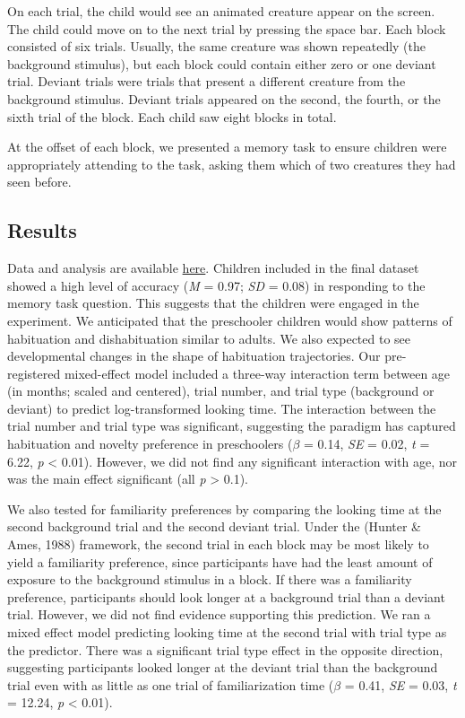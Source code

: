 \documentclass[10pt, letterpaper]{article}
\begin{document}
On each trial, the child would see an animated creature appear on the
screen. The child could move on to the next trial by pressing the space
bar. Each block consisted of six trials. Usually, the same creature was
shown repeatedly (the background stimulus), but each block could contain
either zero or one deviant trial. Deviant trials were trials that
present a different creature from the background stimulus. Deviant
trials appeared on the second, the fourth, or the sixth trial of the
block. Each child saw eight blocks in total.

At the offset of each block, we presented a memory task to ensure
children were appropriately attending to the task, asking them which of
two creatures they had seen before.

\hypertarget{results}{%
\subsection{Results}\label{results}}

Data and analysis are available
\href{https://tinyurl.com/PokebabyCogSci2023}{here}. Children included
in the final dataset showed a high level of accuracy (\emph{M} = 0.97;
\emph{SD} = 0.08) in responding to the memory task question. This
suggests that the children were engaged in the experiment. We
anticipated that the preschooler children would show patterns of
habituation and dishabituation similar to adults. We also expected to
see developmental changes in the shape of habituation trajectories. Our
pre-registered mixed-effect model included a three-way interaction term
between age (in months; scaled and centered), trial number, and trial
type (background or deviant) to predict log-transformed looking time.
The interaction between the trial number and trial type was significant,
suggesting the paradigm has captured habituation and novelty preference
in preschoolers (\(\beta\) = 0.14, \emph{SE} = 0.02, \emph{t} = 6.22,
\emph{p} \textless{} 0.01). However, we did not find any significant
interaction with age, nor was the main effect significant (all \emph{p}
\textgreater{} 0.1).

We also tested for familiarity preferences by comparing the looking time
at the second background trial and the second deviant trial. Under the
(Hunter \& Ames, 1988) framework, the second trial in each block may be
most likely to yield a familiarity preference, since participants have
had the least amount of exposure to the background stimulus in a block.
If there was a familiarity preference, participants should look longer
at a background trial than a deviant trial. However, we did not find
evidence supporting this prediction. We ran a mixed effect model
predicting looking time at the second trial with trial type as the
predictor. There was a significant trial type effect in the opposite
direction, suggesting participants looked longer at the deviant trial
than the background trial even with as little as one trial of
familiarization time (\(\beta\) = 0.41, \emph{SE} = 0.03, \emph{t} =
12.24, \emph{p} \textless{} 0.01).
\end{document}
